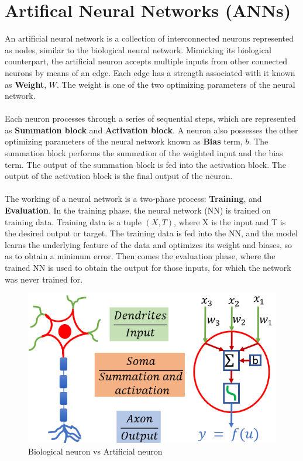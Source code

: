 \documentclass[12pt,a4paper,bold]{thesis}
\theoremstyle{thm}
\theoremstyle{definition}
\begin{document}
\section{Artifical Neural Networks (ANNs)}
 An artificial neural network is a collection of interconnected neurons represented as nodes, similar to the biological neural network. Mimicking its biological counterpart, the artificial neuron accepts multiple inputs from other connected neurons by means of an edge. Each edge has a strength associated with it known as \textbf{Weight}, $W$. The weight is one of the two optimizing parameters of the neural network.\\
\\
Each neuron processes through a series of sequential steps, which are represented as \textbf{Summation block} and \textbf{Activation block}. A neuron also possesses the other optimizing parameters of the neural network known as \textbf{Bias} term, $b$.
The summation block performs the summation of the weighted input and the bias term.
The output of the summation block is fed into the activation block. The output of the activation block is the final output of the neuron.\\
\\
The working of a neural network is a two-phase process: \textbf{Training}, and \textbf{Evaluation}. In the training phase, the neural network (NN) is trained on training data. Training data is a tuple $(X, T)$, where X is the input and T is the desired output or target. The training data is fed into the NN, and the model learns the underlying feature of the data and optimizes its weight and biases, so as to obtain a minimum error. Then comes the evaluation phase, where the trained NN is used to obtain the output for those inputs, for which the network was never trained for.~\cite{khr126}

\begin{figure}[H]
	\centering
   \includegraphics[scale=0.56]{Images/30.png} 
   \caption{Biological neuron vs Artificial neuron }
\end{figure}
\end{document}
